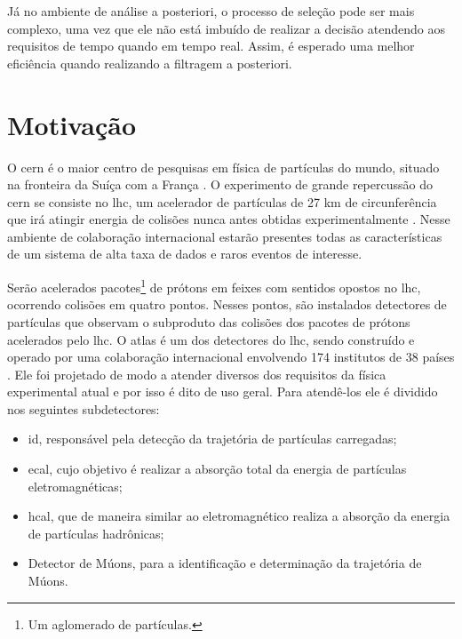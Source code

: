 Já no ambiente de análise a posteriori, o processo de seleção pode ser mais
complexo, uma vez que ele não está imbuído de realizar a decisão atendendo aos
requisitos de tempo quando em tempo real. Assim, é esperado 
uma melhor eficiência quando realizando a filtragem a posteriori.

\section{Motivação} 

O \gls{cern} é o maior centro de
pesquisas em física de partículas do mundo, situado na fronteira da Suíça com a
França \cite{webCERN}. O experimento de grande repercussão do \gls{cern} se
consiste no \gls{lhc}, um acelerador de partículas de 27 km de
circunferência que irá atingir energia de colisões nunca antes obtidas
experimentalmente \cite{webLHC}. 
Nesse ambiente de colaboração internacional estarão presentes
todas as características de um sistema de alta taxa de dados e raros eventos de
interesse.

Serão acelerados pacotes\footnote{Um aglomerado de partículas.} de prótons em
feixes com sentidos opostos no \gls{lhc},
ocorrendo colisões em quatro pontos. Nesses pontos, são instalados 
detectores de partículas que observam o subproduto das colisões dos pacotes de prótons 
acelerados pelo \gls{lhc}. O \gls{atlas} é um dos detectores do
\gls{lhc}, sendo construído e operado por 
uma colaboração internacional envolvendo 174 institutos de 38
países \cite{webATLAS}. Ele foi projetado 
de modo a atender diversos dos requisitos da física experimental atual e por isso é dito de uso
geral. Para atendê-los ele é dividido nos seguintes subdetectores:


\begin{itemize}
\item \gls{id}, responsável pela detecção da trajetória de partículas carregadas;
\item \gls{ecal}, cujo objetivo é realizar a absorção total da
energia de partículas eletromagnéticas;
\item \gls{hcal}, que de maneira similar ao eletromagnético realiza a
absorção da energia de partículas hadrônicas;
\item Detector de Múons, para a identificação e determinação da trajetória de
Múons.
\end{itemize}

